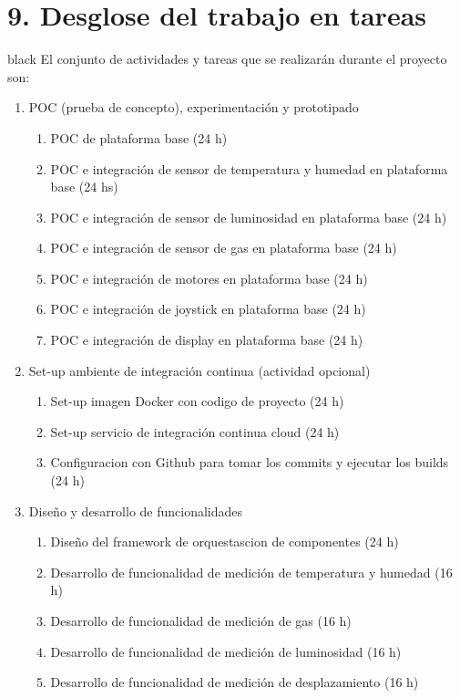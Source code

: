 \documentclass[
11pt, %
codirector, %
]{charter}
\begin{document}
\section{9. Desglose del trabajo en tareas}
\label{sec:wbs}

\begin{consigna}{black}
El conjunto de actividades y tareas que se realizarán durante el proyecto son:

\begin{enumerate}
\item POC (prueba de concepto), experimentación y prototipado
	\begin{enumerate}
	\item POC de plataforma base (24 h)
	\item POC e integración de sensor de temperatura y humedad en plataforma base (24 hs)
	\item POC e integración de sensor de luminosidad en plataforma base (24 h)
	\item POC e integración de sensor de gas en plataforma base (24 h)
	\item POC e integración de motores en plataforma base (24 h)
	\item POC e integración de joystick en plataforma base (24 h)
	\item POC e integración de display en plataforma base (24 h)
	\end{enumerate}
\item Set-up ambiente de integración continua (actividad opcional) 
	\begin{enumerate}
	\item Set-up imagen Docker con codigo de proyecto (24 h)
	\item Set-up servicio de integración continua cloud (24 h)
	\item Configuracion con Github para tomar los commits y ejecutar los builds (24 h)
	\end{enumerate}
\item Diseño y desarrollo de funcionalidades
	\begin{enumerate}
	\item Diseño del framework de orquestascion de componentes (24 h)
	\item Desarrollo de funcionalidad de medición de temperatura y humedad (16 h)
	\item Desarrollo de funcionalidad de medición de gas (16 h)
	\item Desarrollo de funcionalidad de medición de luminosidad (16 h)
	\item Desarrollo de funcionalidad de medición de desplazamiento (16 h)

\end{enumerate}
\end{enumerate}
\end{consigna}
\end{document}
